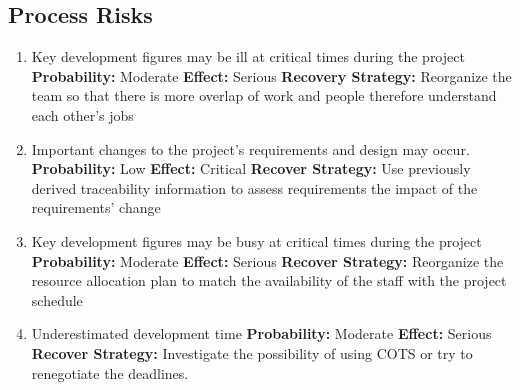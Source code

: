 \documentclass[11pt,titlepage]{article} %
\begin{document}
\subsection{Process Risks}
  \begin{enumerate}
   \item Key development figures may be ill at critical times during the project\newline
	 \textbf{Probability:} Moderate\newline
	 \textbf{Effect:} Serious\newline
	 \textbf{Recovery Strategy:} Reorganize the team so that there is more overlap of work and people therefore understand each other’s jobs\newline
  \item Important changes to the project's requirements and design may occur.
	 \textbf{Probability:} Low\newline
	 \textbf{Effect:} Critical\newline
	 \textbf{Recover Strategy:} Use previously derived traceability information to assess requirements the impact of the requirements' change\newline
  \item Key development figures may be busy at critical times during the project\newline
	\textbf{Probability:} Moderate\newline
	\textbf{Effect:} Serious\newline
	\textbf{Recover Strategy: } Reorganize the resource allocation plan to match the availability of the staff with the project schedule
  \item Underestimated development time\newline
    \textbf{Probability:} Moderate\newline
    \textbf{Effect:} Serious\newline
    \textbf{Recover Strategy:} Investigate the possibility of using COTS or try to renegotiate the deadlines.\newline
  \end{enumerate}
\end{document}
